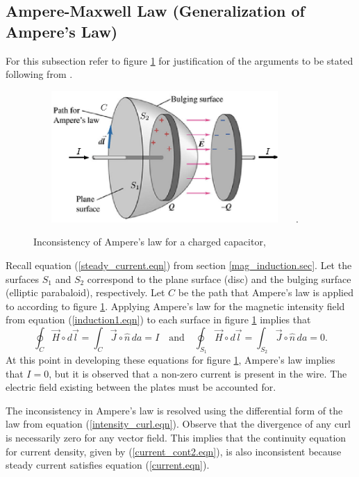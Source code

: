 \documentclass[12pt]{article}
\theoremstyle{definition}
\numberwithin{equation}{section}
\begin{document}
\subsection{Ampere-Maxwell Law (Generalization of Ampere's Law)}\label{gen_amp.sec}
For this subsection refer to figure \ref{ampere.fig} for justification of the arguments to be stated following from \cite{Reitz}.
\begin{figure}[h!]
\centerline{\includegraphics[height = 50mm, width=100mm, angle=0]{ampere.eps}.}
\caption{Inconsistency of Ampere's law for a charged capacitor, \cite{fig_7}}
\label{ampere.fig}
\end{figure}
Recall equation (\ref{steady_current.eqn}) from section \ref{mag_induction.sec}. Let the surfaces $S_1$ and $S_2$ correspond to the plane surface (disc) and the bulging surface (elliptic parabaloid), respectively. Let $C$ be the path that Ampere's law is applied to according to figure \ref{ampere.fig}. Applying Ampere's law for the magnetic intensity field from equation (\ref{induction1.eqn}) to each surface in figure \ref{ampere.fig} implies that
\begin{equation}
\oint_C\vec{H}\circ d\vec{l}=\int_{C}\vec{J}\circ\hat{n}\,da=I\quad\mbox{and}\quad\oint_{S_1}\vec{H}\circ d\vec{l}=\int_{S_2}\vec{J}\circ\hat{n}\,da=0.
\end{equation}
At this point in developing these equations for figure \ref{ampere.fig}, Ampere's law implies that $I=0$, but it is observed that a non-zero current is present in the wire. The electric field existing between the plates must be accounted for. 

The inconsistency in Ampere's law is resolved using the differential form of the law from equation (\ref{intensity_curl.eqn}). Observe that the divergence of any curl is necessarily zero for any vector field. This implies that the continuity equation for current density, given by (\ref{current_cont2.eqn}), is also inconsistent because steady current satisfies equation (\ref{current.eqn}). 
\end{document}
